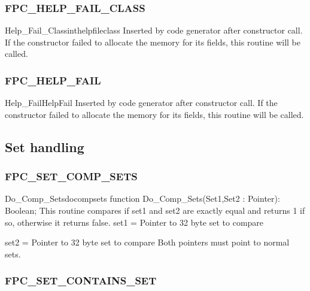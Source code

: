 \documentclass [12pt]{article}
\begin{document}
\subsubsection{FPC{\_}HELP{\_}FAIL{\_}CLASS}
\label{subsubsec:mylabel84}

\begin{functionl}{Help{\_}Fail{\_}Class}{inthelpfileclass}
\Description 
Inserted by code generator after constructor call. If the constructor failed
to allocate the memory for its fields, this routine will be called.
\end{functionl}

\subsubsection{FPC{\_}HELP{\_}FAIL}
\label{subsubsec:mylabel85}

\begin{functionl}{Help{\_}Fail}{HelpFail}
\Description 
Inserted by code generator after constructor call. If the constructor failed
to allocate the memory for its fields, this routine will be called.
\end{functionl}

\subsection{Set handling}
\label{subsec:mylabel10}

\subsubsection{FPC{\_}SET{\_}COMP{\_}SETS}
\label{subsubsec:mylabel86}

\begin{functionl}{Do{\_}Comp{\_}Sets}{docompsets}
\Declaration
function Do{\_}Comp{\_}Sets(Set1,Set2 : Pointer): Boolean;
\Description 
This routine compares if set1 and set2 are exactly equal and returns 1 if
so, otherwise it returns false.
\Parameters 
set1 = Pointer to 32 byte set to compare \par
set2 = Pointer to 32 byte set to compare
\Notes 
Both pointers must point to normal sets. 
\end{functionl}

\subsubsection{FPC{\_}SET{\_}CONTAINS{\_}SET}
\label{subsubsec:mylabel87}
\end{document}
